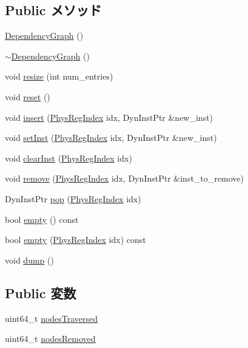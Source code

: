 \subsection*{Public メソッド}
\begin{DoxyCompactItemize}
\item 
\hyperlink{classDependencyGraph_a272991aeaffc4f6a74a9f3de8cb3e055}{DependencyGraph} ()
\item 
\hyperlink{classDependencyGraph_aadf0cefbf15be129075d5c91be7c61b4}{$\sim$DependencyGraph} ()
\item 
void \hyperlink{classDependencyGraph_a3780426d320e4d44a0bc9f44ce6c2175}{resize} (int num\_\-entries)
\item 
void \hyperlink{classDependencyGraph_ad20897c5c8bd47f5d4005989bead0e55}{reset} ()
\item 
void \hyperlink{classDependencyGraph_a8147b910a65e5096dbbb3b8359f375f8}{insert} (\hyperlink{o3_2comm_8hh_a5ec29599c4bc29a3054c451674969e7b}{PhysRegIndex} idx, DynInstPtr \&new\_\-inst)
\item 
void \hyperlink{classDependencyGraph_ade8120ce15ebff1cb55df7995a51d237}{setInst} (\hyperlink{o3_2comm_8hh_a5ec29599c4bc29a3054c451674969e7b}{PhysRegIndex} idx, DynInstPtr \&new\_\-inst)
\item 
void \hyperlink{classDependencyGraph_a68804553aa4fc717c5e467b252ef37ca}{clearInst} (\hyperlink{o3_2comm_8hh_a5ec29599c4bc29a3054c451674969e7b}{PhysRegIndex} idx)
\item 
void \hyperlink{classDependencyGraph_a0f84aaa20d93732630c72593b97f5e13}{remove} (\hyperlink{o3_2comm_8hh_a5ec29599c4bc29a3054c451674969e7b}{PhysRegIndex} idx, DynInstPtr \&inst\_\-to\_\-remove)
\item 
DynInstPtr \hyperlink{classDependencyGraph_a37140b50c279f856724fe1eac144bc3a}{pop} (\hyperlink{o3_2comm_8hh_a5ec29599c4bc29a3054c451674969e7b}{PhysRegIndex} idx)
\item 
bool \hyperlink{classDependencyGraph_ac6e61de369e994009e36f344f99c15ad}{empty} () const 
\item 
bool \hyperlink{classDependencyGraph_a790abdbbdb5625ac65e5e3702b1e1a43}{empty} (\hyperlink{o3_2comm_8hh_a5ec29599c4bc29a3054c451674969e7b}{PhysRegIndex} idx) const 
\item 
void \hyperlink{classDependencyGraph_accd2600060dbaee3a3b41aed4034c63c}{dump} ()
\end{DoxyCompactItemize}
\subsection*{Public 変数}
\begin{DoxyCompactItemize}
\item 
uint64\_\-t \hyperlink{classDependencyGraph_a3872e5bf089b4615d62a04b097795a6e}{nodesTraversed}
\item 
uint64\_\-t \hyperlink{classDependencyGraph_ad997769c2f059584b9ffb4a2e118207b}{nodesRemoved}
\end{DoxyCompactItemize}
